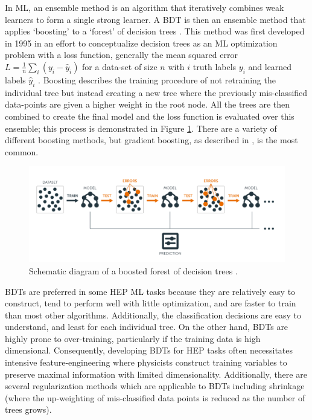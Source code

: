 In ML, an ensemble method is an algorithm that iteratively combines weak learners to form a single strong learner. A BDT is then an ensemble method that applies `boosting' to a `forest' of decision trees . This method was first developed in 1995 in an effort to conceptualize decision trees as an ML optimization problem with a loss function, generally the mean squared error $L=\frac{1}{n}\sum_i(y_{i}-
\hat{y}_{i})$ for a data-set of size $n$ with $i$ truth labels $y_{i}$ and learned labels $\hat{y}_i$ \cite{bdt_paper}. Boosting describes the training procedure of not retraining the individual tree but instead creating a new tree where the previously mis-classified data-points are given a higher weight in the root node. All the trees are then combined to create the final model and the loss function is evaluated over this ensemble; this process is demonstrated in Figure \ref{fig:bdt_diag}. There are a variety of different boosting methods, but gradient boosting, as described in \cite{gradient_boosting}, is the most common.\\

\begin{figure}[htb!]
    \centering
    \includegraphics[width=5in]{figures/chapter4/bdt_diag.png}
    \caption{Schematic diagram of a boosted forest of decision trees \cite{bdt_figure}.}
    \label{fig:bdt_diag}
\end{figure}

BDTs are preferred in some HEP ML tasks because they are relatively easy to construct, tend to perform well with little optimization, and are faster to train than most other algorithms. Additionally, the classification decisions are easy to understand, and least for each individual tree. On the other hand, BDTs are highly prone to over-training, particularly if the training data is high dimensional. Consequently, developing BDTs for HEP tasks often necessitates intensive feature-engineering where physicists construct training variables to preserve maximal information with limited dimensionality. Additionally, there are several regularization methods which are applicable to BDTs including shrinkage (where the up-weighting of mis-classified data points is reduced as the number of trees grows). 

